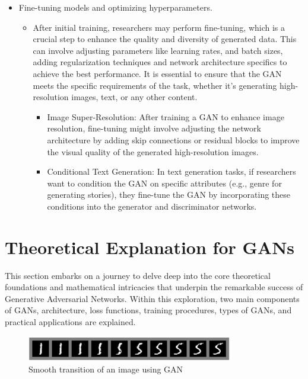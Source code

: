 \begin{itemize}
    \item Fine-tuning models and optimizing hyperparameters.
    \begin{itemize}
        \item After initial training, researchers may perform fine-tuning, which is a crucial step to enhance the quality and diversity of generated data. This can involve adjusting parameters like learning rates, and batch sizes, adding regularization techniques and network architecture specifics to achieve the best performance. It is essential to ensure that the GAN meets the specific requirements of the task, whether it's generating high-resolution images, text, or any other content.
        \begin{itemize}
            \item Image Super-Resolution: After training a GAN to enhance image resolution, fine-tuning might involve adjusting the network architecture by adding skip connections or residual blocks to improve the visual quality of the generated high-resolution images.

            \item Conditional Text Generation: In text generation tasks, if researchers want to condition the GAN on specific attributes (e.g., genre for generating stories), they fine-tune the GAN by incorporating these conditions into the generator and discriminator networks.
        \end{itemize}

    \end{itemize}
\end{itemize}


\section{Theoretical Explanation for GANs}

\noindent
This section embarks on a journey to delve deep into the core theoretical foundations and mathematical intricacies that underpin the remarkable success of Generative Adversarial Networks. Within this exploration, two main components of GANs, architecture, loss functions, training procedures, types of GANs, and practical applications are explained.

\begin{figure}[h!]
    \centering
    \includegraphics[width=0.8\textwidth]{Images/smooth_transition.jpg}
    \caption{Smooth transition of an image using GAN}
\end{figure}

